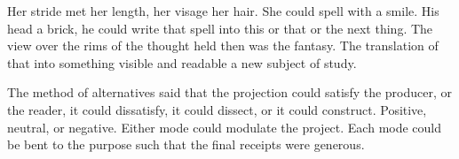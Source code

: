 

﻿Her stride met her length, her visage her hair.  She could spell with
a smile.  His head a brick, he could write that spell into this or
that or the next thing.  The view over the rims of the thought held
then was the fantasy.  The translation of that into something visible
and readable a new subject of study.

The method of alternatives said that the projection could satisfy the
producer, or the reader, it could dissatisfy, it could dissect, or it
could construct.  Positive, neutral, or negative.  Either mode could
modulate the project.  Each mode could be bent to the purpose such
that the final receipts were generous.

\bye
